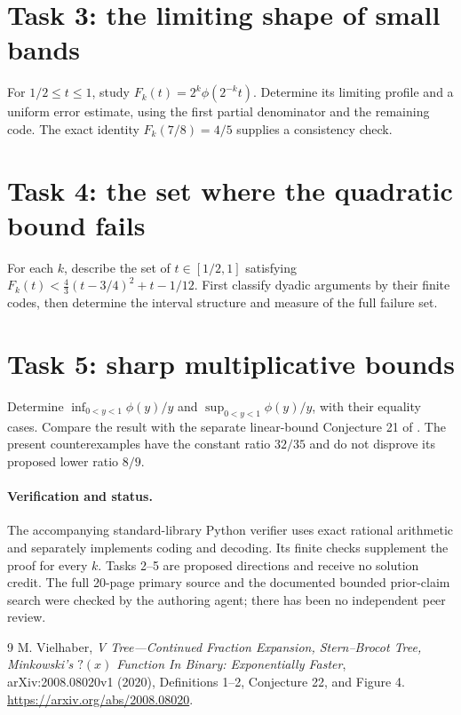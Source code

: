 \documentclass[11pt]{article}
\begin{document}
\section*{Task 3: the limiting shape of small bands}
For $1/2\leq t\leq1$, study $F_k(t)=2^k\phi(2^{-k}t)$.
Determine its limiting profile and a uniform error estimate,
using the first partial denominator and the remaining code.
The exact identity $F_k(7/8)=4/5$ supplies a consistency check.

\section*{Task 4: the set where the quadratic bound fails}
For each $k$, describe the set of $t\in[1/2,1]$ satisfying
$F_k(t)<\frac43(t-3/4)^2+t-1/12$. First classify dyadic
arguments by their finite codes, then determine the interval
structure and measure of the full failure set.

\section*{Task 5: sharp multiplicative bounds}
Determine $\inf_{0<y<1}\phi(y)/y$ and
$\sup_{0<y<1}\phi(y)/y$, with their equality cases. Compare the
result with the separate linear-bound Conjecture 21 of \cite{V}.
The present counterexamples have the constant ratio $32/35$ and
do not disprove its proposed lower ratio $8/9$.

\paragraph{Verification and status.}
The accompanying standard-library Python verifier uses exact
rational arithmetic and separately implements coding and decoding.
Its finite checks supplement the proof for every $k$. Tasks 2--5
are proposed directions and receive no solution credit. The full
20-page primary source and the documented bounded prior-claim
search were checked by the authoring agent; there has been no
independent peer review.

\begin{thebibliography}{9}
 M. Vielhaber,
\emph{V Tree---Continued Fraction Expansion, Stern--Brocot Tree,
Minkowski's $?(x)$ Function In Binary: Exponentially Faster},
arXiv:2008.08020v1 (2020), Definitions 1--2, Conjecture 22,
and Figure 4. \url{https://arxiv.org/abs/2008.08020}.
\end{thebibliography}
\end{document}
